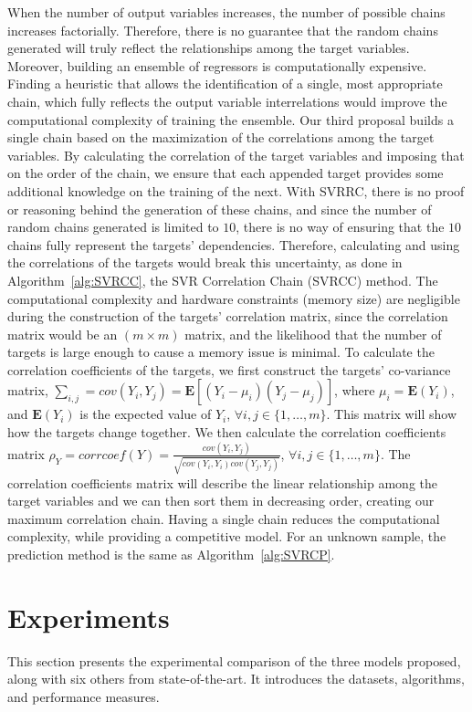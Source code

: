 \documentclass[preprint,12pt]{elsarticle}
\begin{document}
When the number of output variables increases, the number of possible chains increases factorially. Therefore, there is no guarantee that the random chains generated will truly reflect the relationships among the target variables. Moreover, building an ensemble of regressors is computationally expensive. Finding a heuristic that allows the identification of a single, most appropriate chain, which fully reflects the output variable interrelations would improve the computational complexity of training the ensemble. Our third proposal builds a single chain based on the maximization of the correlations among the target variables. By calculating the correlation of the target variables and imposing that on the order of the chain, we ensure that each appended target provides some additional knowledge on the training of the next. With SVRRC, there is no proof or reasoning behind the generation of these chains, and since the number of random chains generated is limited to $10$, there is no way of ensuring that the $10$ chains fully represent the targets' dependencies. Therefore, calculating and using the correlations of the targets would break this uncertainty, as done in Algorithm~\ref{alg:SVRCC}, the SVR Correlation Chain (SVRCC) method. The computational complexity and hardware constraints (memory size) are negligible during the construction of the targets' correlation matrix, since the correlation matrix would be an $(m \times m)$ matrix, and the likelihood that the number of targets is large enough to cause a memory issue is minimal. To calculate the correlation coefficients of the targets, we first construct the targets' co-variance matrix, $\sum_{i,j} = cov(Y_i,Y_j) = \mathbf{E}\left[(Y_i - \mu_i)(Y_j - \mu_j)\right]$, where $\mu_i = \mathbf{E}(Y_i)$, and $\mathbf{E}(Y_i)$ is the expected value of $Y_i$, $\forall i,j \in \{1,\ldots,m\}$. This matrix will show how the targets change together. We then calculate the correlation coefficients matrix $\rho_Y = corrcoef(Y) = \frac{cov(Y_i,Y_j)}{\sqrt{cov(Y_i,Y_i)cov(Y_j,Y_j)}}$, $\forall i,j \in \{1,\ldots,m\}$. The correlation coefficients matrix will describe the linear relationship among the target variables and we can then sort them in decreasing order, creating our maximum correlation chain. Having a single chain reduces the computational complexity, while providing a competitive model. For an unknown sample, the prediction method is the same as Algorithm~\ref{alg:SVRCP}. 



\section{Experiments}\label{sec:experiments}
This section presents the experimental comparison of the three models proposed, along with six others from state-of-the-art. It introduces the datasets, algorithms, and performance measures. 
\end{document}
